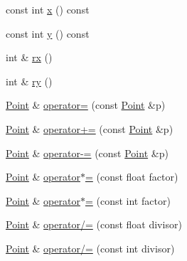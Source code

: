 \begin{DoxyCompactItemize}
\item 
const int \hyperlink{classprism_1_1geometry_1_1_point_ae96742a93b0912b2472afded04ec9321}{x} () const 
\item 
const int \hyperlink{classprism_1_1geometry_1_1_point_a17446c41c039a445a82ef662f7d26312}{y} () const 
\item 
int \& \hyperlink{classprism_1_1geometry_1_1_point_a26c672efa1143b0d23502e54f1432ffa}{rx} ()
\item 
int \& \hyperlink{classprism_1_1geometry_1_1_point_af169459b3bba7d3b002c75c9431065f5}{ry} ()
\item 
\hyperlink{classprism_1_1geometry_1_1_point}{Point} \& \hyperlink{classprism_1_1geometry_1_1_point_ac1962913c14564f07a103be17c73413b}{operator=} (const \hyperlink{classprism_1_1geometry_1_1_point}{Point} \&p)
\item 
\hyperlink{classprism_1_1geometry_1_1_point}{Point} \& \hyperlink{classprism_1_1geometry_1_1_point_a27ced364b5786d535d5ae5db52227fdb}{operator+=} (const \hyperlink{classprism_1_1geometry_1_1_point}{Point} \&p)
\item 
\hyperlink{classprism_1_1geometry_1_1_point}{Point} \& \hyperlink{classprism_1_1geometry_1_1_point_a3d5162efdf56a89798062cdb1ec3abc2}{operator-\/=} (const \hyperlink{classprism_1_1geometry_1_1_point}{Point} \&p)
\item 
\hyperlink{classprism_1_1geometry_1_1_point}{Point} \& \hyperlink{classprism_1_1geometry_1_1_point_a86c49b593444cf4451aeba117426c3af}{operator$\ast$=} (const float factor)
\item 
\hyperlink{classprism_1_1geometry_1_1_point}{Point} \& \hyperlink{classprism_1_1geometry_1_1_point_a61549bbc69b8c5205e0e3a927a4b3553}{operator$\ast$=} (const int factor)
\item 
\hyperlink{classprism_1_1geometry_1_1_point}{Point} \& \hyperlink{classprism_1_1geometry_1_1_point_a4e2abc39c7f70ae9067af50d19d7a755}{operator/=} (const float divisor)
\item 
\hyperlink{classprism_1_1geometry_1_1_point}{Point} \& \hyperlink{classprism_1_1geometry_1_1_point_acc8d86edf696b00a62e644c5feb1ba54}{operator/=} (const int divisor)
\end{DoxyCompactItemize}
